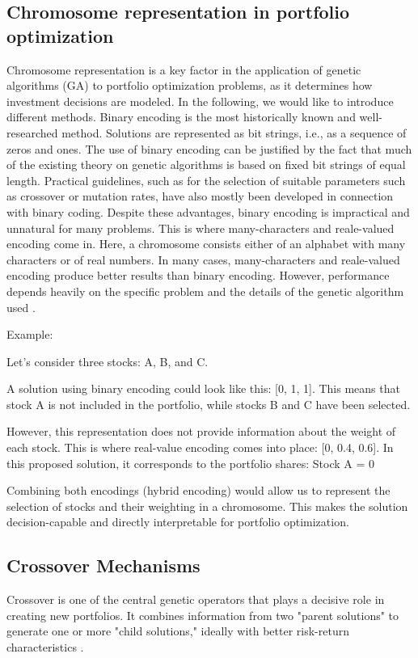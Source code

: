 \documentclass{agasthesis}
\begin{document}
\subsection{Chromosome representation in portfolio optimization}
Chromosome representation is a key factor in the application of genetic algorithms (GA) to portfolio optimization problems, as it determines how investment 
decisions are modeled. In the following, we would like to introduce different methods. Binary encoding is the most historically 
known and well-researched method. Solutions are represented as bit strings, i.e., as a sequence of zeros and ones. 
The use of binary encoding can be justified by the fact that much of the existing theory on genetic algorithms is based on fixed bit strings of equal length. 
Practical guidelines, such as for the selection of suitable parameters such as crossover or mutation rates, have also mostly been developed 
in connection with binary coding. Despite these advantages, binary encoding is impractical and unnatural for many problems. 
This is where many-characters and reale-valued encoding come in. Here, a chromosome consists either of an alphabet with many characters or of real numbers. 
In many cases, many-characters and reale-valued encoding produce better results than binary encoding. However, performance depends heavily on the specific 
problem and the details of the genetic algorithm used \cite[p. 117-118]{melanie_introduction_1999}.

Example:

Let's consider three stocks: A, B, and C.

A solution using binary encoding could look like this: [0, 1, 1]. This means that stock A is not included in the portfolio, 
while stocks B and C have been selected.

However, this representation does not provide information about the weight of each stock. This is where real-value encoding 
comes into place: [0, 0.4, 0.6]. In this proposed solution, it corresponds to the portfolio shares: Stock A = 0%

Combining both encodings (hybrid encoding) would allow us to represent the selection of stocks and their weighting in a chromosome. 
This makes the solution decision-capable and directly interpretable for portfolio optimization.

\subsection{Crossover Mechanisms}
Crossover is one of the central genetic operators that plays a decisive role in creating new portfolios. It combines information from two "parent solutions" 
to generate one or more "child solutions," ideally with better risk-return characteristics \cite[p. 8-9]{melanie_introduction_1999}.
\end{document}

